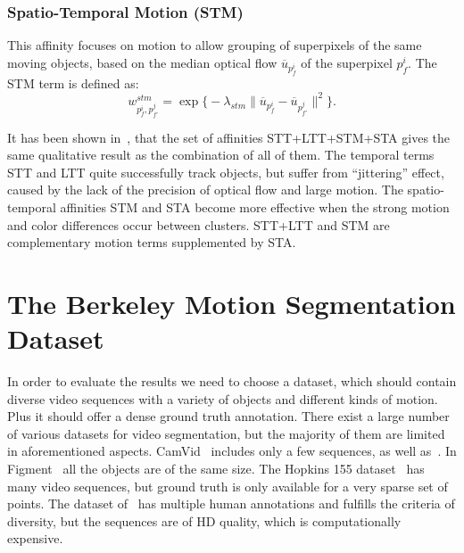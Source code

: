 \subsubsection*{Spatio-Temporal Motion (STM)}
This affinity focuses on motion to allow grouping of superpixels of the same moving objects, based on the median optical flow $\overline{u}_{p_f^i}$ of the superpixel $p_f^i$.
The STM term is defined as:
\begin{equation*}
w^{stm}_{p_f^i,p_{f'}^j} = \exp {\bigl \{ -\lambda_{stm} \lVert \overline{u}_{p_f^i} - \overline{u}_{p_{f'}^j} \rVert^2 \bigr\}}.
\end{equation*}

It has been shown in~\cite{GalassoCS12}, that the set of affinities STT+LTT+STM+STA gives the same qualitative result as the combination of all of them. The temporal terms STT and LTT quite successfully track objects, but suffer from 
``jittering'' effect, caused by the lack of the precision of optical flow and large motion. The spatio-temporal affinities STM and STA become more effective when the strong motion and color differences occur between clusters.
STT+LTT and STM are complementary motion terms supplemented by STA.
\section{The Berkeley Motion Segmentation Dataset}%
\label{sec:ch3_dataset}
In order to evaluate the results we need to choose a dataset, which should contain diverse video sequences with a variety of objects and different kinds of motion. Plus it should offer a dense ground truth annotation.
There exist a large number of various datasets for video segmentation, but the majority of them are limited in aforementioned aspects. CamVid~\cite{BrostowFC09} includes only a few sequences, as well as~\cite{Grundmann10,XuCorso12}. 
In Figment~\cite{FragkiadakiZS12} all the objects are of the same size. The Hopkins 155 dataset~\cite{TronV07} has many video sequences, but ground truth is only available for a very sparse set of points.
The dataset of~\cite{Galasso13} has multiple human annotations and fulfills the criteria of diversity, but the sequences are of HD quality, which is computationally expensive. 

